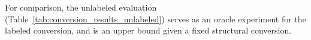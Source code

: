 \documentclass[11pt,a4paper]{article}
\begin{document}
For comparison, the unlabeled evaluation (Table~\ref{tab:conversion_results_unlabeled})
serves as an oracle experiment for the labeled conversion,
and is an upper bound given a fixed structural conversion.


%
%
\end{document}
